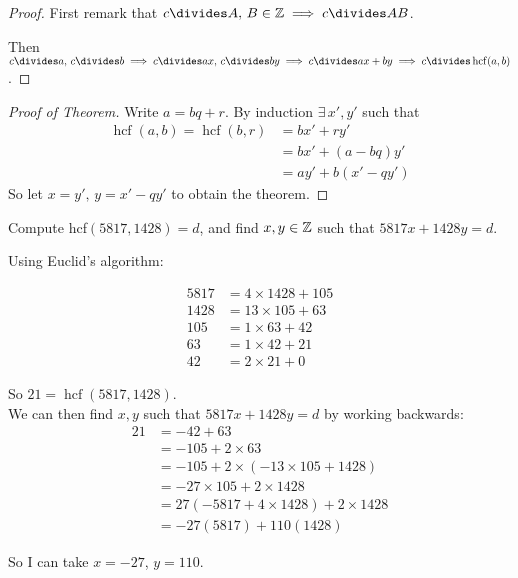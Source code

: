 \documentclass[twoside]{scrartcl}
\DeclareMathOperator{\hcf}{hcf}
\begin{document}
\begin{proof}
First remark that 
$c \divides A,\, B \iZ \implies c \divides AB$.

Then $c \divides a,\, c \divides b \implies c \divides ax,\, c\divides by \implies c \divides ax + by \implies c \divides \hcf(a,b)$. 
\end{proof}

\begin{proof}[Proof of Theorem]
Write $a = bq + r$. By induction $\exists\, x', y'$ such that 
\[
\begin{aligned}
  \hcf(a,b) = \hcf(b,r) &= bx' + ry'\\
  &= bx' + (a-bq)y'\\
  &= ay' + b(x' - qy')
\end{aligned}
\]
So let $x = y',\, y = x' - qy'$ to obtain the theorem.
\end{proof}\vspace*{5pt}

\begin{example}  
Compute hcf$(5817, 1428) = d$, and find $x,y\in\mathbb{Z}$ such that $5817 x + 1428 y = d$. 	

Using Euclid's algorithm: 

\[
\begin{aligned}
  5817 &= 4 \times 1428 + 105\\
  1428 &= 13 \times 105 + 63\\
  105 &= 1 \times 63 + 42\\
  63 &= 1 \times 42 + 21\\
  42 &= 2 \times 21 + 0
\end{aligned}
\]

So $21 = \hcf(5817,1428)$.\\ 


We can then find $x,y$ such that $5817x + 1428y = d$ by working backwards:
\[
\begin{aligned}
  21 &= -42 + 63\\
  &= -105 + 2\times 63\\
  &= -105 + 2 \times(-13 \times 105 + 1428)\\
  &= -27 \times 105 + 2 \times 1428\\
  &= 27 (-5817 + 4\times 1428) + 2\times 1428\\
  &= -27(5817) + 110(1428)
\end{aligned}
\]

So I can take $x = -27$, $y = 110.$
\end{example}
\end{document}
